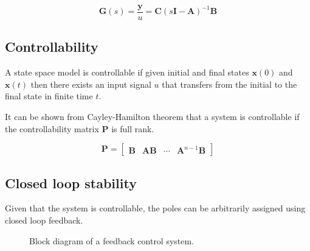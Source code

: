 \documentclass{article}
\begin{document}
\begin{equation} 
  \mathbf{G}(s) = \frac{\mathbf{y}}{u} = \mathbf{C} (s\mathbf{I} - \mathbf{A}) ^{-1} \mathbf{B}
\end{equation}

\subsection{Controllability}


A state space model is controllable if given initial and final states $\mathbf{x}(0)$ and $\mathbf{x}(t)$
then there exists an input signal $u$ that transfers from the initial to the final state in finite time $t$.

It can be shown from Cayley-Hamilton theorem that a system is controllable if the controllability matrix $\mathbf{P}$ is full rank.

\begin{equation}
  \mathbf{P} = \begin{bmatrix}
    \mathbf{B} & \mathbf{AB} & \cdots & \mathbf{A}^{n-1}\mathbf{B}
  \end{bmatrix}
\end{equation}

\subsection{Closed loop stability}
Given that the system is controllable, the poles can be arbitrarily assigned using closed loop feedback.

\begin{figure}[H]
  \centering
  \caption{Block diagram of a feedback control system.}
  \label{fig:feedback_control_system}
\end{figure}
\end{document}
